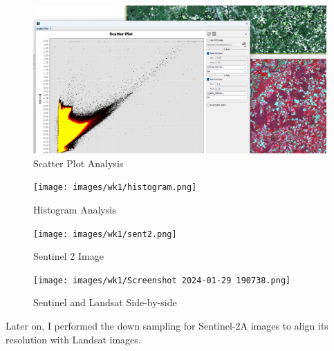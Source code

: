 \documentclass[
  letterpaper,
  DIV=11,
  numbers=noendperiod]{scrreprt}
\begin{document}
\begin{figure}

{\centering \includegraphics[width=8.26042in,height=\textheight]{images/wk1/scatterplot.png}

}

\caption{Scatter Plot Analysis}

\end{figure}

\begin{figure}

{\centering \texttt{[image: images/wk1/histogram.png]}

}

\caption{Histogram Analysis}

\end{figure}

\begin{figure}

{\centering \texttt{[image: images/wk1/sent2.png]}

}

\caption{Sentinel 2 Image}

\end{figure}

\begin{figure}

{\centering \texttt{[image: images/wk1/Screenshot 2024-01-29 190738.png]}

}

\caption{Sentinel and Landsat Side-by-side}

\end{figure}

Later on, I performed the down sampling for Sentinel-2A images to align
its resolution with Landsat images.
\end{document}
